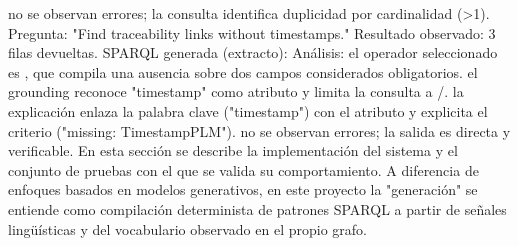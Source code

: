 \markdownRendererUlItem {} no se observan errores; la consulta identifica duplicidad por cardinalidad (>1).\markdownRendererUlItemEnd 
\markdownRendererUlEndTight \markdownRendererInterblockSeparator
{}\markdownRendererInterblockSeparator
{}Pregunta: "Find traceability links without timestamps."\markdownRendererInterblockSeparator
{}Resultado observado: 3 filas devueltas.\markdownRendererInterblockSeparator
{}SPARQL generada (extracto):\markdownRendererInterblockSeparator
{}\markdownRendererInterblockSeparator
{}Análisis:\markdownRendererInterblockSeparator
{}\markdownRendererUlBeginTight
\markdownRendererUlItem {} el operador seleccionado es , que compila una ausencia sobre dos campos considerados obligatorios.\markdownRendererUlItemEnd 
\markdownRendererUlItem {} el grounding reconoce "timestamp" como atributo y limita la consulta a /.\markdownRendererUlItemEnd 
\markdownRendererUlItem {} la explicación enlaza la palabra clave ("timestamp") con el atributo y explicita el criterio ("missing: TimestampPLM").\markdownRendererUlItemEnd 
\markdownRendererUlItem {} no se observan errores; la salida es directa y verificable.\markdownRendererUlItemEnd 
\markdownRendererUlEndTight \markdownRendererInterblockSeparator
{}\markdownRendererHorizontalRule{}\markdownRendererInterblockSeparator
{}\markdownRendererInterblockSeparator
{}En esta sección se describe la implementación del sistema y el conjunto de pruebas con el que se valida su comportamiento. A diferencia de enfoques basados en modelos generativos, en este proyecto la "generación" se entiende como compilación determinista de patrones SPARQL a partir de señales lingüísticas y del vocabulario observado en el propio grafo.\markdownRendererInterblockSeparator
